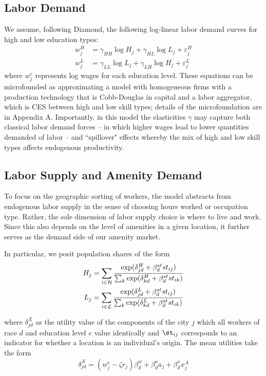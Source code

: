\documentclass{article}
\begin{document}
\subsection{Labor Demand}

We assume, following Diamond, the following log-linear labor demand curves for high and low education types: 
\begin{align}
    w_{j}^H &= \gamma_{HH}\log H_{j} + \gamma_{HL} \log L_{j} + \varepsilon_{j}^H \label{eq_wage_h_aprx} 
    \\ 
    w_{j}^L &= \gamma_{LL}\log L_{j} + \gamma_{LH} \log H_{j} + \varepsilon_{j}^L \label{eq_wage_l_aprx} 
\end{align}
 where $w_j^e$ represents log wages for each education level. These equations can be microfounded as approximating a model with homogeneous firms with a  production technology that is Cobb-Douglas in capital and a labor aggregator, which is CES between high and low skill types; details of the microfoundation are in Appendix A. Importantly, in this model the elasticities $\gamma$ may capture both classical labor demand forces  -- in which higher wages lead to lower quantities demanded of labor -- and ``spillover" effects whereby the mix of high and low skill types affects endogenous productivity. 

\subsection{Labor Supply and Amenity Demand }


To focus on the geographic sorting of workers, the model abstracts from endogenous labor supply in the sense of choosing hours worked or occupation type. Rather, the sole dimension of labor supply choice is where to live and work. Since this also depends on the level of amenities in a given location, it further serves as the demand side of our amenity market.

In particular, we posit population shares of the form 
\begin{align}\label{eq: population shares} 
H_{j} &= \sum_{i\in\mathcal{H}} \frac{\exp(\delta_{jd}^H + \beta_d^{st}st_{ij})}{\sum_{k} \exp(\delta_{kd}^H + \beta_d^{st}st_{ik})} \\
L_{j} &= \sum_{i\in\mathcal{L}} \frac{\exp(\delta_{jd}^L + \beta_d^{st}st_{ij})}{\sum_{k} \exp(\delta_{kd}^L + \beta_d^{st}st_{ik})}
\end{align}

where  $\delta_{jd}^X$ as the utility value of the components of the city $j$ which all workers of race $d$ and education level $e$ value identically and $\st_{ij}$ corresponds to an indicator for whether a location is an individual's origin. The mean utilities take the form 
\begin{equation} \delta_{jd}^X = (w_{j}^e - \zeta r_{j})\beta_d^w + \beta^a_d a_{j} + \beta^x_d x_{j}^A \end{equation}
\end{document}
